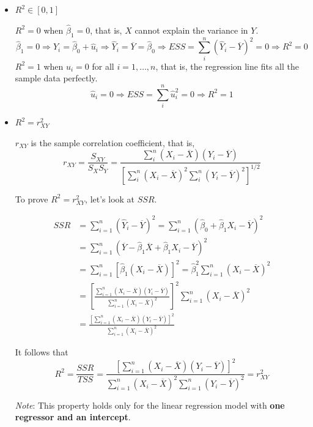 \documentclass[a4paper,11pt]{article}
\begin{document}
\begin{itemize}
\item \(R^2 \in [0, 1]\)
\label{sec:org96472e3}

\(R^2 = 0\) when \(\hat{\beta}_1 = 0\), that is, \(X\) cannot explain the
variance in \(Y\).
\begin{equation*}
\hat{\beta}_1 = 0 \Rightarrow Y_i = \hat{\beta}_0 + \hat{u}_i
\Rightarrow \hat{Y}_i = \overline{Y} = \hat{\beta}_0 \Rightarrow ESS
= \sum_i^n (\hat{Y}_i - \overline{Y})^2 = 0 \Rightarrow R^2 = 0
\end{equation*}
\(R^2 = 1\) when \(\hat{u}_i = 0\) for all \(i = 1, \ldots, n\), that is,
the regression line fits all the sample data perfectly.
\[ \hat{u}_i = 0 \Rightarrow ESS = \sum_i^n \hat{u}_i^2 = 0
  \Rightarrow R^2 = 1 \]

\item \(R^2 = r^2_{XY}\)
\label{sec:org9bd962b}

\(r_{XY}\) is the sample correlation coefficient, that is,
\[ r_{XY} = \frac{S_{XY}}{S_X S_Y} = \frac{\sum_i^n(X_i -
  \overline{X})(Y_i - \overline{Y})}{\left[\sum_i^n (X_i - \overline{X})^2 \sum_i^n (Y_i -
  \overline{Y})^2 \right]^{1/2}} \]

To prove \(R^2 = r^2_{XY}\), let's look at \(SSR\).

\begin{align*}
SSR &= \sum_{i=1}^n (\hat{Y}_i - \overline{Y})^2 = \sum_{i=1}^n (\hat{\beta}_0 + \hat{\beta}_1 X_i - \overline{Y})^2 \\
&= \sum_{i=1}^n (\overline{Y} - \hat{\beta}_1 \overline{X} + \hat{\beta}_1 X_i - \overline{Y})^2 \\
&= \sum_{i=1}^n \left[ \hat{\beta}_1 (X_i - \overline{X}) \right]^2 = \hat{\beta}_1^2 \sum_{i=1}^n (X_i - \overline{X})^2 \\
&= \left[\frac{\sum_{i=1}^n (X_i - \overline{X})(Y_i - \overline{Y})}{\sum_{i=1}^n (X_i - \overline{X})^2}\right]^2 \sum_{i=1}^n (X_i - \overline{X})^2 \\
&= \frac{\left[ \sum_{i=1}^n (X_i - \overline{X})(Y_i - \overline{Y}) \right]^2}{\sum_{i=1}^n (X_i - \overline{X})^2}
\end{align*}

It follows that
\[
  R^2 = \frac{SSR}{TSS} = \frac{\left[ \sum_{i=1}^n (X_i - \overline{X})(Y_i - \overline{Y}) \right]^2}{\sum_{i=1}^n (X_i - \overline{X})^2 \sum_{i=1}^n (Y_i - \overline{Y})^2} = r^2_{XY}
  \]

\emph{Note}: This property holds only for the linear regression model
with \textbf{one regressor and an intercept}.
\end{itemize}
\end{document}
